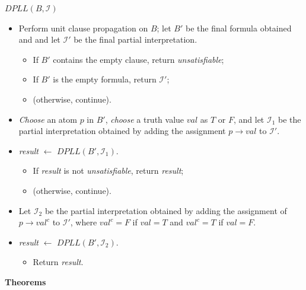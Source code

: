 \documentclass[11pt]{report}
\begin{document}
\noindent $\textit{DPLL}(B,\mathcal{I})$
\begin{itemize}

\item Perform unit clause propagation on $B$; let $B'$ be the final
formula obtained and and let $\mathcal{I}'$ be the final partial
interpretation.

\begin{itemize}
\item If $B'$ contains the empty clause, return \emph{unsatisfiable};
\item If $B'$ is the empty formula, return $\mathcal{I}'$;
\item (otherwise, continue).
\end{itemize}
\item \emph{Choose} an atom $p$ in $B'$, \emph{choose} a truth value
$\textit{val}$ as $T$ or $F$, and let $\mathcal{I}_1$ be the
partial interpretation obtained by adding the assignment
$p\rightarrow \textit{val}$  to $\mathcal{I}'$. 

\item \textit{result} $\leftarrow$ $\textit{DPLL}(B',\mathcal{I}_1)$.
\begin{itemize}
\item If \textit{result} is not \emph{unsatisfiable}, return \textit{result};
\item (otherwise, continue).
\end{itemize}

\item Let $\mathcal{I}_2$ be the partial interpretation obtained by
adding the assignment of $p\rightarrow \textit{val}^c$ to
$\mathcal{I}'$, where $\textit{val}^c = F$ if $\textit{val} = T$ and
$\textit{val}^c = T$ if $\textit{val} = F$.

\item \textit{result} $\leftarrow$ $\textit{DPLL}(B',\mathcal{I}_2)$.
\begin{itemize}
\item Return \textit{result}.
\end{itemize}
\end{itemize}

\newpage

\begin{center}
\textbf{Theorems}
\end{center}
\end{document}

